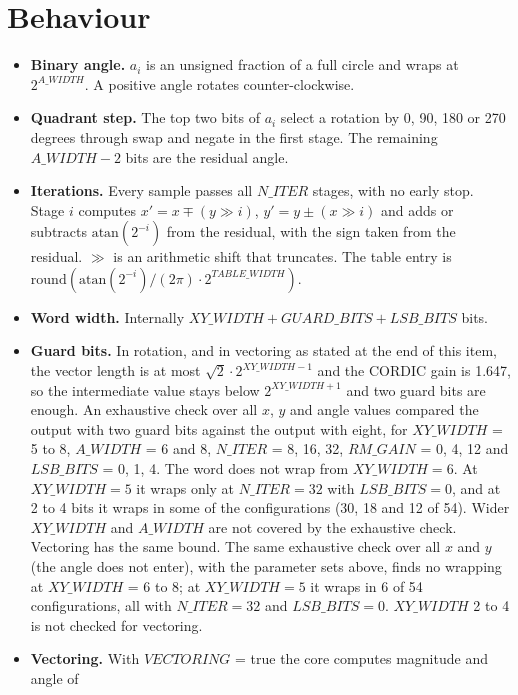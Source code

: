\documentclass[a4paper, 12pt, notitlepage]{report}
\begin{document}
\section{Behaviour}
\begin{itemize}
   \item \textbf{Binary angle.} $a_i$ is an unsigned fraction of a full circle and wraps at
         $2^{A\_WIDTH}$. A positive angle rotates counter-clockwise.
   \item \textbf{Quadrant step.} The top two bits of $a_i$ select a rotation by 0, 90, 180 or
         270 degrees through swap and negate in the first stage. The remaining
         $A\_WIDTH-2$ bits are the residual angle.
   \item \textbf{Iterations.} Every sample passes all $N\_ITER$ stages, with no early stop.
         Stage $i$ computes $x' = x \mp (y \gg i)$, $y' = y \pm (x \gg i)$ and
         adds or subtracts $\mathrm{atan}(2^{-i})$ from the residual, with the sign taken from the
         residual. $\gg$ is an arithmetic shift that truncates.
         The table entry is
         $\mathrm{round}( \mathrm{atan}(2^{-i}) / (2\pi) \cdot 2^{TABLE\_WIDTH} )$.
   \item \textbf{Word width.} Internally $XY\_WIDTH + GUARD\_BITS + LSB\_BITS$ bits.
   \item \textbf{Guard bits.} In rotation, and in vectoring as stated at the end of this item, the vector length is at most $\sqrt{2} \cdot 2^{XY\_WIDTH-1}$ and the
         CORDIC gain is 1.647, so the intermediate value stays below $2^{XY\_WIDTH+1}$ and two guard
         bits are enough. An exhaustive check over all $x$, $y$ and angle values compared the output with
         two guard bits against the output with eight, for $XY\_WIDTH$ = 5 to 8, $A\_WIDTH$ = 6 and 8,
         $N\_ITER$ = 8, 16, 32, $RM\_GAIN$ = 0, 4, 12 and $LSB\_BITS$ = 0, 1, 4. The word does not wrap
         from $XY\_WIDTH = 6$. At $XY\_WIDTH = 5$ it wraps only at $N\_ITER = 32$ with $LSB\_BITS = 0$,
         and at 2 to 4 bits it wraps in some of the configurations (30, 18 and 12 of 54). Wider $XY\_WIDTH$ and $A\_WIDTH$ are not covered by the
         exhaustive check. Vectoring has the same bound. The same exhaustive check over all $x$ and $y$
         (the angle does not enter), with the parameter sets above, finds no wrapping at $XY\_WIDTH$ = 6 to 8;
         at $XY\_WIDTH = 5$ it wraps in 6 of 54 configurations, all with $N\_ITER = 32$ and $LSB\_BITS = 0$.
         $XY\_WIDTH$ 2 to 4 is not checked for vectoring.
   \item \textbf{Vectoring.} With $VECTORING$ = true the core computes magnitude and angle of

\end{itemize}
\end{document}
